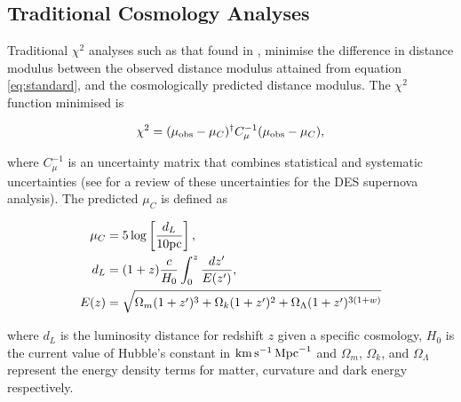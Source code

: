 \documentclass[a4paper,fleqn,usenatbib]{emulateapj}
\newcommand{\kmsmpc}{{\rm km}\,{\rm s}^{-1}\,{\rm Mpc}^{-1}}
\begin{document}
\subsection{Traditional Cosmology Analyses} \label{sec:traditional}

Traditional $\chi^2$ analyses such as that found in \citet{Riess1998, Perlmutter1999, Wood-Vasey2007, Kowalski2008, Kessler2009, Conley2011, Betoule2014}, minimise the difference in distance modulus between the observed distance modulus attained from equation \ref{eq:standard}, and the cosmologically predicted distance modulus. The $\chi^2$ function minimised is

\begin{align}
\chi^2 = (\mu_{\rm obs} - \mu_C)^\dagger C^{-1}_{\mu} (\mu_{\rm obs} - \mu_C),
\end{align}

where $C^{-1}_{\mu}$ is an uncertainty matrix that combines statistical and systematic uncertainties (see \citet{Brout18SYS} for a review of these uncertainties for the DES supernova analysis). The predicted $\mu_C$ is defined as
 
\begin{align}
\mu_C &= 5 \log\left[ \frac{d_L}{10{\rm pc}} \right], \label{eq:mu0}\\
d_L& = (1+z)\frac{c}{H_0} \int_0^z \frac{dz'}{E(z')},\\
E(z) &= \sqrt{ \Omega_m (1+z')^3 + \Omega_k (1 + z')^2 + \Omega_\Lambda (1+z')^{3(1+w)}}
\end{align}

where $d_L$ is the luminosity distance for redshift $z$ given a specific cosmology, $H_0$ is the current value of Hubble's constant in $\kmsmpc$ and $\Omega_m$, $\Omega_k$, and $\Omega_\Lambda$ represent the energy density terms for matter, curvature and dark energy respectively.
\end{document}
